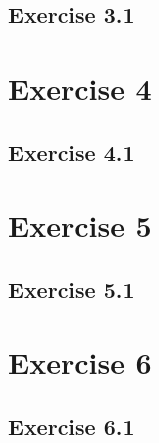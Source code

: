 \documentclass[a4paper]{article}
\begin{document}
\subsection{Exercise 3.1}
\indent \indent 



\section{Exercise 4}
\subsection{Exercise 4.1}
\indent \indent 



\section{Exercise 5}
\subsection{Exercise 5.1}
\indent \indent 



\section{Exercise 6}
\subsection{Exercise 6.1}
\indent \indent 

\end{document}
